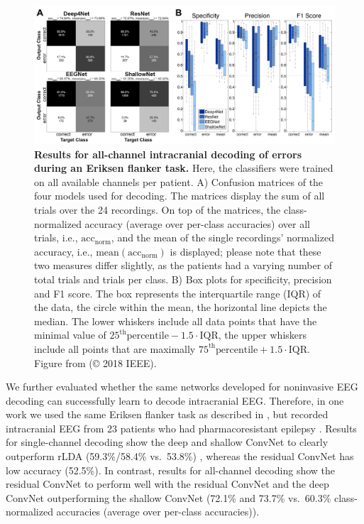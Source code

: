 \begin{figure}[h!tb]
    \myfloatalign
    \includegraphics[width=1\linewidth]{images/IntracranialError.png}
    \caption[Results for all-channel intracranial decoding of errors during
an Eriksen flanker task]{
\textbf{Results for all-channel intracranial decoding of errors during
an Eriksen flanker task.} Here, the classifiers were trained on all
available channels per patient. A) Confusion matrices of the four models
used for decoding. The matrices display the sum of all trials over the
24 recordings. On top of the matrices, the class-normalized accuracy
(average over per-class accuracies) over all trials, i.e.,
$\mathrm{acc}_\mathrm{norm}$, and the mean of the single recordings'
normalized accuracy, i.e., $\mathrm{mean}(\mathrm{acc}_\mathrm{norm})$
is displayed; please note that these two measures differ slightly, as
the patients had a varying number of total trials and trials per class.
B) Box plots for specificity, precision and F1 score. The box represents
the interquartile range (IQR) of the data, the circle within the mean,
the horizontal line depicts the median. The lower whiskers include all
data points that have the minimal value of
$25^\mathrm{th} \mathrm{percentile}-1.5 \cdot \mathrm{IQR}$, the upper
whiskers include all points that are maximally
$75^\mathrm{th} \mathrm{percentile}+1.5 \cdot \mathrm{IQR}$. Figure
from \citet{volker2018intracranial} (© 2018 IEEE).
}
\label{intracranial-error-results-fig}
\end{figure}

    We further evaluated whether the same networks developed for noninvasive
EEG decoding can successfully learn to decode intracranial EEG.
Therefore, in one work we used the same Eriksen flanker task as
described in , but recorded
intracranial EEG from 23 patients who had pharmacoresistant epilepsy
\cite{volker2018intracranial}. Results for single-channel
decoding  show the
deep and shallow ConvNet to clearly outperform rLDA (59.3\%/58.4\%
vs.~53.8\%) , whereas the residual ConvNet has low accuracy (52.5\%). In
contrast, results for all-channel decoding
 show the residual
ConvNet to perform well with the residual ConvNet and the deep ConvNet
outperforming the shallow ConvNet (72.1\% and 73.7\% vs.~60.3\%
class-normalized accuracies (average over per-class accuracies)).

